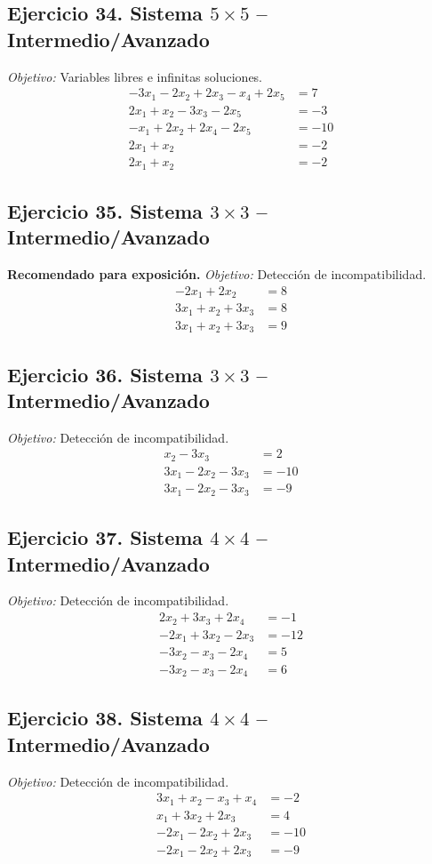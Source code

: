 \documentclass[12pt]{article}
\theoremstyle{remark}
\begin{document}
\subsection*{Ejercicio 34. Sistema $5\times5$ -- Intermedio/Avanzado}
\emph{Objetivo:} Variables libres e infinitas soluciones.
\[
\begin{aligned}
- 3 x_{1} - 2 x_{2} + 2 x_{3} - x_{4} + 2 x_{5} &= 7\\
2 x_{1} + x_{2} - 3 x_{3} - 2 x_{5} &= -3\\
- x_{1} + 2 x_{2} + 2 x_{4} - 2 x_{5} &= -10\\
2 x_{1} + x_{2} &= -2\\
2 x_{1} + x_{2} &= -2
\end{aligned}
\]
\subsection*{Ejercicio 35. Sistema $3\times3$ -- Intermedio/Avanzado}
\textbf{Recomendado para exposición.} \emph{Objetivo:} Detección de incompatibilidad.
\[
\begin{aligned}
- 2 x_{1} + 2 x_{2} &= 8\\
3 x_{1} + x_{2} + 3 x_{3} &= 8\\
3 x_{1} + x_{2} + 3 x_{3} &= 9
\end{aligned}
\]
\subsection*{Ejercicio 36. Sistema $3\times3$ -- Intermedio/Avanzado}
\emph{Objetivo:} Detección de incompatibilidad.
\[
\begin{aligned}
x_{2} - 3 x_{3} &= 2\\
3 x_{1} - 2 x_{2} - 3 x_{3} &= -10\\
3 x_{1} - 2 x_{2} - 3 x_{3} &= -9
\end{aligned}
\]
\subsection*{Ejercicio 37. Sistema $4\times4$ -- Intermedio/Avanzado}
\emph{Objetivo:} Detección de incompatibilidad.
\[
\begin{aligned}
2 x_{2} + 3 x_{3} + 2 x_{4} &= -1\\
- 2 x_{1} + 3 x_{2} - 2 x_{3} &= -12\\
- 3 x_{2} - x_{3} - 2 x_{4} &= 5\\
- 3 x_{2} - x_{3} - 2 x_{4} &= 6
\end{aligned}
\]
\subsection*{Ejercicio 38. Sistema $4\times4$ -- Intermedio/Avanzado}
\emph{Objetivo:} Detección de incompatibilidad.
\[
\begin{aligned}
3 x_{1} + x_{2} - x_{3} + x_{4} &= -2\\
x_{1} + 3 x_{2} + 2 x_{3} &= 4\\
- 2 x_{1} - 2 x_{2} + 2 x_{3} &= -10\\
- 2 x_{1} - 2 x_{2} + 2 x_{3} &= -9
\end{aligned}
\]
\end{document}
